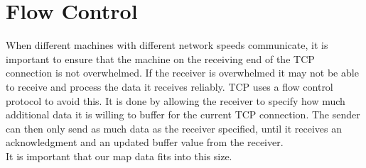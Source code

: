 \section{Flow Control}
When different machines with different network speeds communicate, it is important to ensure that the machine on the receiving end of the TCP connection is not overwhelmed. If the receiver is overwhelmed it may not be able to receive and process the data it receives reliably. TCP uses a flow control protocol to avoid this. It is done by allowing the receiver to specify how much additional data it is willing to buffer for the current TCP connection. The sender can then only send as much data as the receiver specified, until it receives an acknowledgment and an updated buffer value from the receiver.\\

It is important that our map data fits into this size.